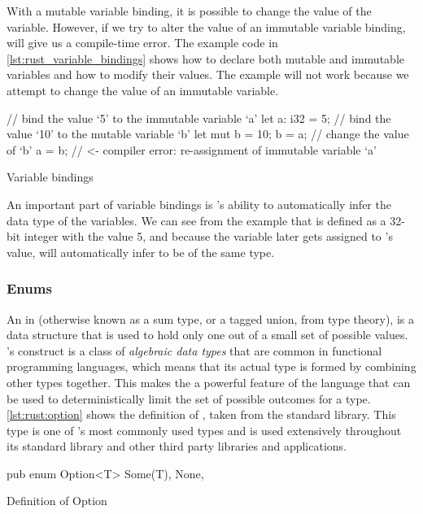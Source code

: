 With a mutable variable binding, it is possible to change the value of the variable.
However, if we try to alter the value of an immutable variable binding, {\rust} will give us a compile-time error.
The example code in \autoref{lst:rust_variable_bindings} shows how to declare both mutable and immutable variables and how to modify their values.
The example will not work because we attempt to change the value of an immutable variable.

\begin{listing}[H]
  \begin{rustcode}
// bind the value `5' to the immutable variable `a'
let a: i32 = 5;
// bind the value `10' to the mutable variable `b'
let mut b = 10;
b = a; // change the value of `b'
a = b; // <- compiler error: re-assignment of immutable variable `a'
  \end{rustcode}
  \caption{Variable bindings}
  \label{lst:rust_variable_bindings}
\end{listing}

An important part of variable bindings is {\rust}'s ability to automatically infer the data type of the variables.
We can see from the example that  is defined as a 32-bit integer with the value 5, and because the variable  later gets assigned to 's value, {\rust} will automatically infer  to be of the same type.

\subsubsection{Enums}

An {\enum} in {\rust} (otherwise known as a sum type, or a tagged union, from type theory), is a data structure that is used to hold only one out of a small set of possible values.
\rust's {\enum} construct is a class of \emph{algebraic data types} that are common in functional programming languages, which means that its actual type is formed by combining other types together.
This makes the {\enum} a powerful feature of the language that can be used to deterministically limit the set of possible outcomes for a type.
\autoref{lst:rust:option} shows the definition of , taken from the standard library.
This type is one of {\rust}'s most commonly used types and is used extensively throughout its standard library and other third party libraries and applications.

\begin{listing}[H]
  \begin{rustcode}
pub enum Option<T> {
  Some(T),
  None,
}
  \end{rustcode}
  \caption{Definition of Option}
  \label{lst:rust:option}
\end{listing}

